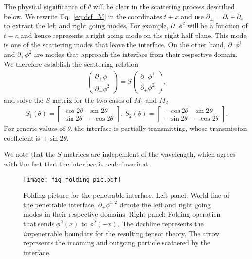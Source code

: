 The physical significance of $\theta$ will be clear in the scattering process described below. We rewrite Eq.~\eqref{eq:def_M} in the coordinates $t\pm x$ and use $\partial_{\pm} = \partial_{t} \pm \partial_x $ to extract the left and right going modes. For example, $\partial_{-} \phi^2$ will be a function of $t - x$ and hence represents a right going mode on the right half plane. This mode is one of the scattering modes that leave the interface. On the other hand, $\partial_{-} \phi^1$ and $\partial_{+} \phi^2$ are modes that approach the interface from their respective domain. We therefore establish the scattering relation 
\begin{equation}\begin{aligned}
\label{eq:def_S}
\begin{pmatrix}
\partial_+\phi^1\\
\partial_-\phi^2
\end{pmatrix}
=S
\begin{pmatrix}
\partial_-\phi^1\\
\partial_+\phi^2
\end{pmatrix},
\end{aligned}\end{equation}
and solve the $S$ matrix for the two cases of $M_1$ and $M_2$
\begin{equation}\begin{aligned}
\label{eq:S1_S2}
S_1(\theta)=\begin{bmatrix}
\cos 2\theta & \sin 2\theta \\
\sin 2\theta & -\cos 2\theta
\end{bmatrix},\
S_2(\theta)=\begin{bmatrix}
-\cos 2\theta & \sin 2\theta \\
-\sin 2\theta & -\cos 2\theta
\end{bmatrix}.
\end{aligned}\end{equation}
For generic values of $\theta$, the interface is partially-transmitting, {\color{red}whose transmission coefficient is $\pm \sin 2 \theta$.}

We note that the $S$-matrices are independent of the wavelength, which agrees with the fact that the interface is scale invariant. 
\begin{figure}[h]
\centering
\texttt{[image: fig\_folding\_pic.pdf]}
\caption{Folding picture for the penetrable interface. Left panel: World line of the penetrable interface. $\partial_\pm\phi^{1,2}$ denote the left and right going modes in their respective domains. Right panel: Folding operation that sends $\phi^2(x)$ to $\phi^2(-x)$. The dashline represents the \emph{im}penetrable boundary for the resulting tensor theory. The arrow represents the incoming and outgoing particle scattered by the interface.}
\label{fig:folding_pic}
\end{figure}

